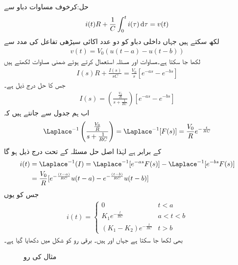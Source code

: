 حل:کرخوف مساوات دباو سے 
\begin{align*}
i(t)R+\frac{1}{C}\int_{0}^{t} i(\tau)\dif \tau=v(t)
\end{align*}
لکھ سکتے ہیں جہاں داخلی دباو کو دو عدد اکائی سیڑھی تفاعل کی مدد سے 
\begin{align*}
v(t)=V_0(u(t-a)-u(t-b))
\end{align*}
لکھا جا سکتا ہے۔مساوات  اور مسئلہ  استعمال کرتے ہوئے  ضمنی مساوات لکھتے ہیں
\begin{align*}
I(s)R+\frac{I(s)}{sC}=\frac{V_0}{s}[e^{-as}-e^{-bs}]
\end{align*}
جس کا حل درج ذیل ہے۔
\begin{align*}
I(s)=\left(\frac{\frac{V_0}{R}}{s+\frac{1}{RC}}\right)[e^{-as}-e^{-bs}]
\end{align*}
اب ہم جدول  سے جانتے ہیں کہ
\begin{align*}
\Laplace^{-1}\left(\frac{\frac{V_0}{R}}{s+\frac{1}{RC}}\right)=\Laplace^{-1}[F(s)]=\frac{V_0}{R}e^{-\frac{t}{RC}}
\end{align*}
کے برابر ہے لہٰذا اصل حل مسئلہ  کے تحت  درج ذیل ہو گا
\begin{align*}
i(t)&=\Laplace^{-1}(I)=\Laplace^{-1}[e^{-as}F(s)]-\Laplace^{-1}[e^{-bs}F(s)]\\
&=\frac{V_0}{R}[e^{-\frac{(t-a)}{RC}}u(t-a)-e^{-\frac{(t-b)}{RC}}u(t-b)]
\end{align*}
جس کو یوں
\begin{align*}
i(t)=
\begin{cases}
0&t<a\\
K_1e^{-\frac{t}{RC}}& a<t<b\\
(K_1-K_2)e^{-\frac{t}{RC}} & t>b
\end{cases}
\end{align*}
بھی لکھا جا سکتا ہے جہاں  اور  ہیں۔ برقی رو  کو شکل  میں دکھایا گیا ہے۔
\begin{figure}
\centering
{}
\caption{مثال  کی رو }
\label{شکل_مثال_لاپلاس_سلسلہ_وار_دور_الف_رو}
\end{figure}

